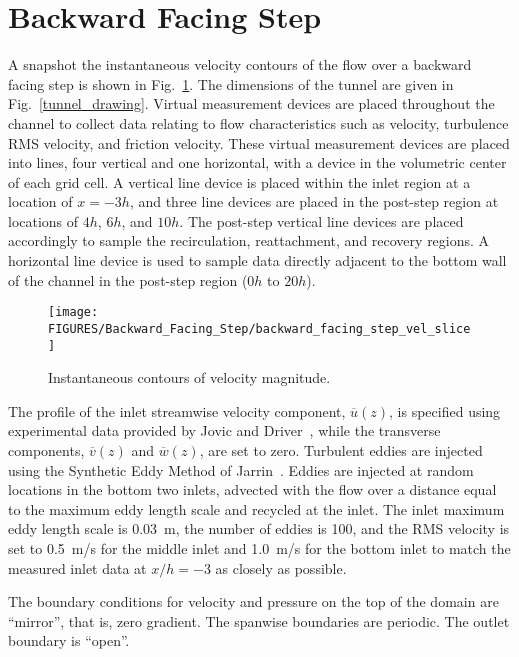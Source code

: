 \clearpage

\section{Backward Facing Step}

A snapshot the instantaneous velocity contours of the flow over a backward facing step is shown in Fig.~\ref{fig:vel_slice}. The dimensions of the tunnel are given in Fig.~\ref{tunnel_drawing}. Virtual measurement devices are placed throughout the channel to collect data relating to flow characteristics such as velocity, turbulence RMS velocity, and friction velocity.  These virtual measurement devices are placed into lines, four vertical and one horizontal, with a device in the volumetric center of each grid cell.  A vertical line device is placed within the inlet region at a location of $x=-3h$, and three line devices are placed in the post-step region at locations of $4h$, $6h$, and $10h$. The post-step vertical line devices are placed accordingly to sample the recirculation, reattachment, and recovery regions.  A horizontal line device is used to sample data directly adjacent to the bottom wall of the channel in the post-step region ($0h$ to $20h$).

\begin{figure}[!htb]
    \centering
    \texttt{[image: FIGURES/Backward\_Facing\_Step/backward\_facing\_step\_vel\_slice]}
    \caption[Instantaneous contours of velocity magnitude]{Instantaneous contours of velocity magnitude.}
    \label{fig:vel_slice}
\end{figure}

The profile of the inlet streamwise velocity component, $\overline{u}(z)$, is specified using experimental data provided by Jovic and Driver~\cite{JD:1994}, while the transverse components, $\overline{v}(z)$ and $\overline{w}(z)$, are set to zero.  Turbulent eddies are injected using the Synthetic Eddy Method of Jarrin~\cite{Jarrin:2008}.  Eddies are injected at random locations in the bottom two inlets, advected with the flow over a distance equal to the maximum eddy length scale and recycled at the inlet.  The inlet maximum eddy length scale is 0.03~m, the number of eddies is 100, and the RMS velocity is set to 0.5~m/s for the middle inlet and 1.0~m/s for the bottom inlet to match the measured inlet data at $x/h=-3$ as closely as possible.

The boundary conditions for velocity and pressure on the top of the domain are ``mirror'', that is, zero gradient.  The spanwise boundaries are periodic.  The outlet boundary is ``open''.

